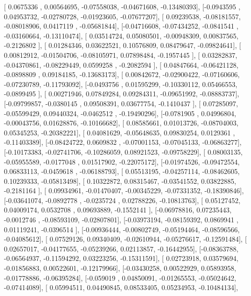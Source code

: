 \documentclass{article}
\begin{document}
       [ 0.0675336 ,  0.00564695, -0.07558038, -0.04671608, -0.13480393],
       [-0.0943595 ,  0.04953732, -0.02780728, -0.01923605, -0.07677207],
       [ 0.09239538, -0.08181557, -0.08018906,  0.0417119 , -0.05681844],
       [-0.04716608, -0.07434252, -0.0841541 , -0.03160664, -0.13110474],
       [ 0.03514724,  0.05080501, -0.00948309,  0.00837565, -0.2126802 ],
       [ 0.01284346,  0.03622521,  0.10576809,  0.08479647, -0.09824641],
       [ 0.00812912, -0.01504706, -0.08105971,  0.07898484, -0.1957445 ],
       [ 0.03282837, -0.04370861, -0.08229449,  0.0599258 , -0.2082594 ],
       [ 0.04847664, -0.06421128, -0.0898809 ,  0.09184185, -0.13683173],
       [ 0.00842672, -0.02900422, -0.07160606, -0.07230789, -0.11793092],
       [-0.0493756 ,  0.01595299, -0.10330112,  0.05466553, -0.0899495 ],
       [ 0.00271946,  0.07849284,  0.09284311, -0.09651992, -0.08883737],
       [-0.09799857, -0.0380145 ,  0.09508391,  0.03677754, -0.1410437 ],
       [ 0.07285097, -0.05599429,  0.09440324, -0.0462512 , -0.19490296],
       [-0.0781905 ,  0.04996804, -0.00043756,  0.01628876, -0.10166682],
       [ 0.08585661,  0.01013726, -0.08704003,  0.05345253, -0.20382221],
       [ 0.04081629, -0.05648635,  0.09830254,  0.0129361 , -0.11403389],
       [-0.08424722,  0.0609832 , -0.07001153, -0.07045133, -0.06863277],
       [-0.10173383, -0.02741706, -0.10286059,  0.08921523, -0.09758229],
       [ 0.08003135, -0.05955589, -0.0177048 ,  0.01517902, -0.22075172],
       [-0.01974526, -0.09472554,  0.06833113, -0.0459618 , -0.06188793],
       [ 0.05513195, -0.04257114, -0.08462605,  0.10239333, -0.05813498],
       [ 0.10322872,  0.08315467, -0.03541552,  0.03822885, -0.2181164 ],
       [ 0.09934961, -0.01470407, -0.00345229, -0.07331352, -0.18390846],
       [-0.03641074, -0.0892778 , -0.0235724 ,  0.02788226, -0.10813763],
       [ 0.05127452,  0.04009174,  0.0532708 ,  0.09693889, -0.1552141 ],
       [-0.06978816,  0.07235443, -0.0012746 , -0.08593109, -0.02807801],
       [-0.03973194, -0.08159392,  0.0869941 ,  0.01119241, -0.0396514 ],
       [-0.00936444, -0.00802749, -0.05194464, -0.08596566, -0.04085612],
       [ 0.07529126,  0.09340409, -0.02610944, -0.05276617, -0.12591484],
       [ 0.02657017, -0.04177655, -0.05239266,  0.02113857, -0.16442955],
       [-0.08363788, -0.06564937, -0.11594292,  0.03223256, -0.15311591],
       [ 0.02723918,  0.03579694, -0.01856883,  0.00522601, -0.12179966],
       [-0.03430258,  0.00522929,  0.05893958, -0.01778886, -0.06395284],
       [-0.059019  ,  0.04850091, -0.01265553, -0.05024642, -0.07414089],
       [ 0.05994511,  0.04490845,  0.08533405,  0.05234953, -0.10484134],
\end{document}
